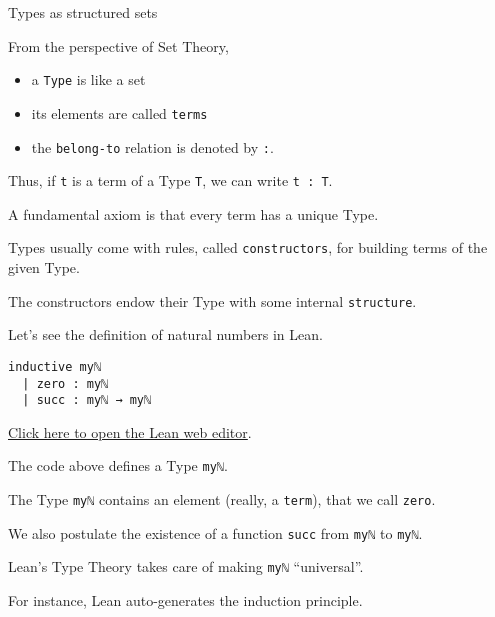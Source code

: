 \documentclass{beamer}
\begin{document}
\begin{frame}[fragile]{Types as structured sets}

From the perspective of Set Theory,

\vspace{-18pt}
\begin{itemize}
\setlength\itemsep{-18pt}
\item
  a {\color{violet}\verb`Type`} is like a set
\item
  its elements are called {\color{violet}\verb`terms`}
\item
  the {\color{violet}\verb`belong-to`} relation is denoted by {\color{violet}\verb`:`}.
\end{itemize}

Thus, if {\color{violet}\verb`t`} is a term of a Type {\color{violet}\verb`T`}, we can write {\color{violet}\verb`t : T`}.

A fundamental axiom is that every term has a unique Type.

Types usually come with rules, called {\color{violet}\verb`constructors`}, for building terms of the given Type.

The constructors endow their Type with some internal {\color{violet}\verb`structure`}.

Let's see the definition of natural numbers in Lean.
\end{frame}

\begin{frame}[fragile]

\begin{verbatim}
inductive myℕ
  | zero : myℕ
  | succ : myℕ → myℕ
\end{verbatim}
{\small{\href{https://leanprover-community.github.io/lean-web-editor/#code=inductive%20my%E2%84%95%0A%20%20%7C%20zero%20%3A%20my%E2%84%95%0A%20%20%7C%20succ%20%3A%20my%E2%84%95%20%E2%86%92%20my%E2%84%95%0A%0A%23print%20prefix%20my%E2%84%95%0A}{Click here to open the Lean web editor}.}}
\bigskip

The code above defines a Type {\color{violet}\verb`myℕ`}.
\bigskip

The Type {\color{violet}\verb`myℕ`} contains an element (really, a {\color{violet}\verb`term`}), that we call {\color{violet}\verb`zero`}.
\bigskip

We also postulate the existence of a function {\color{violet}\verb`succ`} from {\color{violet}\verb`myℕ`} to {\color{violet}\verb`myℕ`}.
\bigskip

Lean's Type Theory takes care of making {\color{violet}\verb`myℕ`} ``universal''.
\bigskip

For instance, Lean auto-generates the induction principle.
\end{frame}
\end{document}
